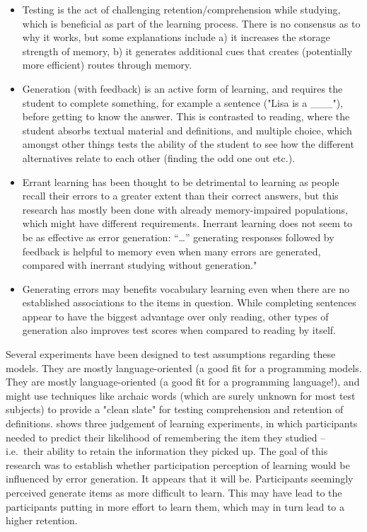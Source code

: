 \begin{itemize}

\item Testing is the act of challenging retention/comprehension while studying,
  which is beneficial as part of the learning process. There is no consensus as
  to why it works, but some explanations include a) it increases the storage
  strength of memory, b) it generates additional cues that creates (potentially
  more efficient) routes through memory.\cite[p.6]{potts2014benefit}

\item Generation (with feedback) is an active form of learning, and requires the
  student to complete something, for example a sentence ("Lisa is a \_\_\_"),
  before getting to know the answer. This is contrasted to reading, where the
  student absorbs textual material and definitions, and multiple choice, which
  amongst other things tests the ability of the student to see how the different
  alternatives relate to each other (finding the odd one out etc.).

\item Errant learning has been thought to be detrimental to learning as people
  recall their errors to a greater extent than their correct
  answers\cite{potts2014benefit}, but this research has mostly been done with
  already memory-impaired populations, which might have different requirements.
  Inerrant learning does not seem to be as effective as error generation: 
  ``\dots'' generating responses followed by feedback is helpful to memory 
  even when many errors are generated, compared with inerrant studying without
  generation."\cite[p.54]{potts2014benefit}

\item Generating errors may benefits vocabulary learning even when there are 
  no established associations to the items in 
  question\cite[p.54]{potts2014benefit}. While completing sentences appear to 
  have the biggest advantage over only reading, other types of generation also 
  improves test scores when compared to reading by 
  itself\cite[p.73]{benassi2014applying}.

\end{itemize}

Several experiments have been designed to test assumptions regarding
these models. They are mostly language-oriented (a good fit for a programming
models. They are mostly language-oriented (a good fit for a programming
language!), and might use techniques like archaic words (which are surely
unknown for most test subjects) to provide a "clean slate" for testing
comprehension and retention of definitions. \cite{potts2014benefit} shows 
three judgement of learning experiments, in which participants needed to 
predict their likelihood of remembering the item they studied -- i.e.\ their 
ability to retain the information they picked up. The goal of this research 
was to establish whether participation perception of learning would be 
influenced by error generation. It appears that it will be. Participants 
seemingly perceived generate items as more difficult to learn. This may have 
lead to the participants putting in more effort to learn them, which may in 
turn lead to a higher retention.

